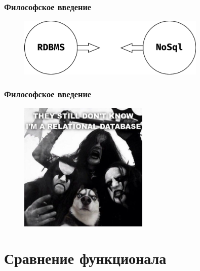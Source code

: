 \documentclass[14pt, compress, aspectratio=169]{beamer}
\begin{document}
\begin{frame}[fragile]
    \frametitle{Философское введение}
    \vspace{-35pt}
    \begin{figure}
        \includegraphics[width=0.8\textwidth,center]{rdbms_nosql_3.png}
    \end{figure}
\end{frame}

\begin{frame}
    \frametitle{Философское введение}
    \vspace{-39pt}
    \begin{figure}
        \includegraphics[width=0.55\textwidth,center]{black_metal_dog2.jpg}
    \end{figure}
\end{frame}

\section{Сравнение функционала}
\end{document}
